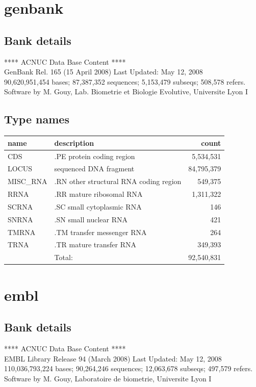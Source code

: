\documentclass{article}
\begin{document}
\begin{Schunk}
\section{ genbank }
\subsection{Bank details}
             ****     ACNUC Data Base Content      ****                         \\
          GenBank Rel. 165 (15 April 2008) Last Updated: May 12, 2008\\
90,620,951,454 bases; 87,387,352 sequences; 5,153,479 subseqs; 508,578 refers.\\
Software by M. Gouy, Lab. Biometrie et Biologie Evolutive, Universite Lyon I 

\subsection{Type names}
\noindent\begin{tabular}{llr}
\hline \hline
name & description & count \\
\hline
CDS  &  .PE protein coding region  &  5,534,531 \\
LOCUS  &  sequenced DNA fragment  &  84,795,379 \\
MISC\_RNA  &  .RN other structural RNA coding region  &  549,375 \\
RRNA  &  .RR mature ribosomal RNA  &  1,311,322 \\
SCRNA  &  .SC small cytoplasmic RNA  &  146 \\
SNRNA  &  .SN small nuclear RNA  &  421 \\
TMRNA  &  .TM transfer messenger RNA  &  264 \\
TRNA  &  .TR mature transfer RNA  &  349,393 \\
\hline
 & Total: & 92,540,831 \\
\hline \hline
\end{tabular}

\section{ embl }
\subsection{Bank details}
             ****     ACNUC Data Base Content      ****                         \\
        EMBL Library Release 94 (March 2008) Last Updated: May 12, 2008\\
110,036,793,224 bases; 90,264,246 sequences; 12,063,678 subseqs; 497,579 refers.\\
Software by M. Gouy, Laboratoire de biometrie, Universite Lyon I 


\end{Schunk}
\end{document}
